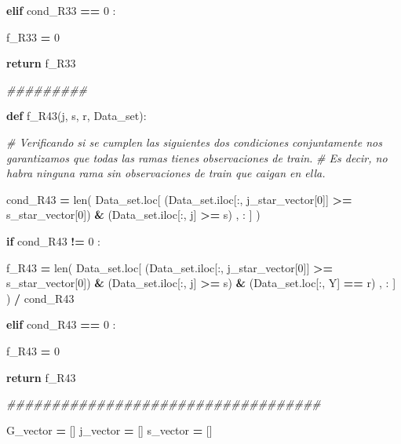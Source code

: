 \documentclass[
  11pt,
  a4paper,
]{article}
\newenvironment{Shaded}{\begin{snugshade}}{\end{snugshade}}
\newcommand{\BuiltInTok}[1]{#1}
\newcommand{\CommentTok}[1]{\textcolor[rgb]{0.56,0.35,0.01}{\textit{#1}}}
\newcommand{\ControlFlowTok}[1]{\textcolor[rgb]{0.13,0.29,0.53}{\textbf{#1}}}
\newcommand{\DecValTok}[1]{\textcolor[rgb]{0.00,0.00,0.81}{#1}}
\newcommand{\KeywordTok}[1]{\textcolor[rgb]{0.13,0.29,0.53}{\textbf{#1}}}
\newcommand{\NormalTok}[1]{#1}
\newcommand{\OperatorTok}[1]{\textcolor[rgb]{0.81,0.36,0.00}{\textbf{#1}}}
\newcommand{\StringTok}[1]{\textcolor[rgb]{0.31,0.60,0.02}{#1}}
\begin{document}
\begin{Shaded}
\begin{Highlighting}[]
            
            \ControlFlowTok{elif}\NormalTok{ cond\_R33 }\OperatorTok{==} \DecValTok{0}\NormalTok{ :}

\NormalTok{                f\_R33 }\OperatorTok{=} \DecValTok{0}

            
            \ControlFlowTok{return}\NormalTok{ f\_R33}

        \CommentTok{\#\#\#\#\#\#\#\#\#}

        \KeywordTok{def}\NormalTok{ f\_R43(j, s, r, Data\_set):}

           \CommentTok{\# Verificando si se cumplen las siguientes dos condiciones conjuntamente nos garantizamos que todas las ramas tienes observaciones de train. }
           \CommentTok{\# Es decir, no habra ninguna rama sin observaciones de train que caigan en ella.}

\NormalTok{            cond\_R43 }\OperatorTok{=} \BuiltInTok{len}\NormalTok{( Data\_set.loc[ (Data\_set.iloc[:, j\_star\_vector[}\DecValTok{0}\NormalTok{]] }\OperatorTok{\textgreater{}=}\NormalTok{ s\_star\_vector[}\DecValTok{0}\NormalTok{]) }\OperatorTok{\&}\NormalTok{ (Data\_set.iloc[:, j] }\OperatorTok{\textgreater{}=}\NormalTok{ s) , : ] ) }

            \ControlFlowTok{if}\NormalTok{  cond\_R43 }\OperatorTok{!=} \DecValTok{0}\NormalTok{ :}

\NormalTok{                f\_R43 }\OperatorTok{=} \BuiltInTok{len}\NormalTok{( Data\_set.loc[ (Data\_set.iloc[:, j\_star\_vector[}\DecValTok{0}\NormalTok{]] }\OperatorTok{\textgreater{}=}\NormalTok{ s\_star\_vector[}\DecValTok{0}\NormalTok{]) }\OperatorTok{\&}\NormalTok{ (Data\_set.iloc[:, j] }\OperatorTok{\textgreater{}=}\NormalTok{ s) }\OperatorTok{\&}\NormalTok{ (Data\_set.loc[:, }\StringTok{\textquotesingle{}Y\textquotesingle{}}\NormalTok{] }\OperatorTok{==}\NormalTok{ r) , : ] ) }\OperatorTok{/}\NormalTok{ cond\_R43}

            
            \ControlFlowTok{elif}\NormalTok{ cond\_R43 }\OperatorTok{==} \DecValTok{0}\NormalTok{ :}

\NormalTok{                f\_R43 }\OperatorTok{=} \DecValTok{0}

            
            \ControlFlowTok{return}\NormalTok{ f\_R43 }

        
        \CommentTok{\#\#\#\#\#\#\#\#\#\#\#\#\#\#\#\#\#\#\#\#\#\#\#\#\#\#\#\#\#\#\#\#\#\#\#}

\NormalTok{        G\_vector }\OperatorTok{=}\NormalTok{ []}
\NormalTok{        j\_vector }\OperatorTok{=}\NormalTok{ []}
\NormalTok{        s\_vector }\OperatorTok{=}\NormalTok{ []}



\end{Highlighting}
\end{Shaded}
\end{document}
